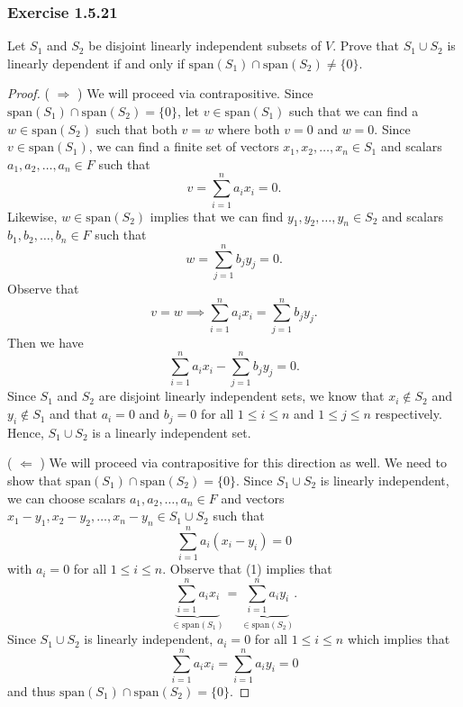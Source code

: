 \subsubsection{Exercise 1.5.21} Let \( S_{1}  \) and \( S_{2}  \) be disjoint linearly independent subsets of \( V  \). Prove that \( S_{1} \cup S_{2}  \) is linearly dependent if and only if \( \text{span}(S_{1}) \cap  \text{span}(S_{2} ) \neq \{ 0  \}  \).
\begin{proof}
    ( \( \Rightarrow \) ) We will proceed via contrapositive. Since \( \text{span}(S_{1}) \cap \text{span}(S_{2}) = \{ 0  \}  \), let \( v \in \text{span}(S_{1}) \) such that we can find a \( w \in \text{span}(S_{2}) \) such that both  \( v = w   \) where both \( v =0  \) and \( w = 0  \). Since \( v \in \text{span}(S_{1}) \), we can find a finite set of vectors \( x_{1}, x_{2}, \dots, x_{n} \in S_{1} \) and scalars \( a_{1} , a_{2} , \dots, a_{n} \in F  \) such that 
    \[ v =  \sum_{ i=1 }^{ n } a_{i} x_{i} = 0.  \]
    Likewise, \( w \in \text{span}(S_{2}) \) implies that we can find \( y_{1}, y_{2}, \dots, y_{n} \in S_{2} \) and scalars \( b_{1}, b_{2} , \dots, b_{n} \in F  \) such that 
    \[ w = \sum_{ j=1 }^{ n } b_{j} y_{j} = 0.   \]
    Observe that 
    \[  v = w \implies \sum_{ i=1 }^{ n } a_{i} x_{i} = \sum_{ j=1 }^{ n } b_{j}y_{j}.  \]
    Then we have
    \[  \sum_{ i=1 }^{ n } a_{i} x_{i} - \sum_{ j=1 }^{ n } b_{j} y_{j} = 0. \] Since \( S_{1} \) and \( S_{2}  \) are disjoint linearly independent sets, we know that \( x_{i} \notin S_{2}  \) and \( y_{i} \notin S_{1} \) and that \( a_{i} = 0  \) and \( b_{j} = 0  \) for all \( 1 \leq i \leq n  \) and \( 1 \leq j \leq n \) respectively. Hence, \( S_{1} \cup S_{2}  \) is a linearly independent set.

    ( \( \Leftarrow  \) ) We will proceed via contrapositive for this direction as well. We need to show that \( \text{span}(S_{1} ) \cap \text{span}(S_{2}) = \{ 0  \}  \). Since \( S_{1} \cup S_{2}  \) is linearly independent, we can choose scalars \( a_{1}, a_{2}, \dots, a_{n} \in F  \) and vectors \( x_{1} - y_{1}, x_{2} - y_{2}, \dots, x_{n} - y_{n} \in S_{1} \cup S_{2}  \) such that 
    \[  \sum_{ i=1 }^{ n } a_{i} (x_{i} - y_{i}) = 0 \tag{1}  \]
    with \( a_{i} = 0  \) for all \( 1 \leq i \leq n \). Observe that (1) implies that 
    \[  \underbrace{\sum_{ i=1 }^{ n } a_{i} x_{i}}_{\in \text{span}(S_{1})} = \underbrace{\sum_{ i=1 }^{ n } a_{i} y_{i}}_{\in \text{span}(S_{2})}. \] Since \( S_{1} \cup S_{2}  \) is linearly independent, \( a_{i} = 0  \) for all \( 1 \leq i \leq n  \) which implies that 
    \[  \sum_{ i=1 }^{ n } a_{i} x_{i} = \sum_{ i=1 }^{ n } a_{i} y_{i} = 0 \]
    and thus \( \text{span}(S_{1}) \cap \text{span}(S_{2}) = \{ 0 \}. \)
    
\end{proof}
